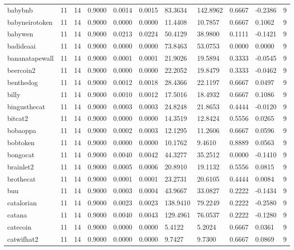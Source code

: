 \begin{table}[htbp]
\begin{tabular}{lllllllllll}
babybnb & 11 & 14 & 0.9000 & 0.0014 & 0.0015 & 83.3634 & 142.8962 & 0.6667 & -0.2386 & 9 \\
babyneirotoken & 11 & 14 & 0.9000 & 0.0000 & 0.0000 & 11.4408 & 10.7857 & 0.6667 & 0.1062 & 9 \\
babywen & 11 & 14 & 0.9000 & 0.0213 & 0.0224 & 50.4129 & 38.9800 & 0.1111 & -0.1421 & 9 \\
badideaai & 11 & 14 & 0.9000 & 0.0000 & 0.0000 & 73.8463 & 53.0753 & 0.0000 & 0.0000 & 9 \\
bananatapewall & 11 & 14 & 0.9000 & 0.0001 & 0.0001 & 21.9026 & 19.5894 & 0.3333 & -0.0545 & 9 \\
beercoin2 & 11 & 14 & 0.9000 & 0.0000 & 0.0000 & 22.2052 & 19.8479 & 0.3333 & -0.0462 & 9 \\
benthedog & 11 & 14 & 0.9000 & 0.0012 & 0.0018 & 28.4366 & 22.1197 & 0.6667 & 0.0497 & 9 \\
billy & 11 & 14 & 0.9000 & 0.0010 & 0.0012 & 17.5016 & 18.4932 & 0.6667 & 0.1086 & 9 \\
bingusthecat & 11 & 14 & 0.9000 & 0.0003 & 0.0003 & 24.8248 & 21.8653 & 0.4444 & -0.0120 & 9 \\
bitcat2 & 11 & 14 & 0.9000 & 0.0000 & 0.0000 & 14.3519 & 12.8424 & 0.5556 & 0.0265 & 9 \\
bobaoppa & 11 & 14 & 0.9000 & 0.0002 & 0.0003 & 12.1295 & 11.2606 & 0.6667 & 0.0596 & 9 \\
bobtoken & 11 & 14 & 0.9000 & 0.0000 & 0.0000 & 10.1762 & 9.4610 & 0.8889 & 0.0563 & 9 \\
bongocat & 11 & 14 & 0.9000 & 0.0040 & 0.0042 & 44.3277 & 35.2512 & 0.0000 & -0.1410 & 9 \\
brainlet2 & 11 & 14 & 0.9000 & 0.0005 & 0.0006 & 20.8910 & 19.1132 & 0.5556 & 0.0815 & 9 \\
brothecat & 11 & 14 & 0.9000 & 0.0001 & 0.0001 & 23.2731 & 20.6105 & 0.4444 & 0.0084 & 9 \\
buu & 11 & 14 & 0.9000 & 0.0003 & 0.0004 & 43.9667 & 33.0827 & 0.2222 & -0.1434 & 9 \\
catalorian & 11 & 14 & 0.9000 & 0.0023 & 0.0023 & 138.9410 & 79.2249 & 0.2222 & -0.2580 & 9 \\
catana & 11 & 14 & 0.9000 & 0.0040 & 0.0043 & 129.4961 & 76.0537 & 0.2222 & -0.1280 & 9 \\
catecoin & 11 & 14 & 0.9000 & 0.0000 & 0.0000 & 5.4122 & 5.2024 & 0.6667 & 0.0361 & 9 \\
catwifhat2 & 11 & 14 & 0.9000 & 0.0000 & 0.0000 & 9.7427 & 9.7300 & 0.6667 & 0.0869 & 9 \\

\end{tabular}
\end{table}
